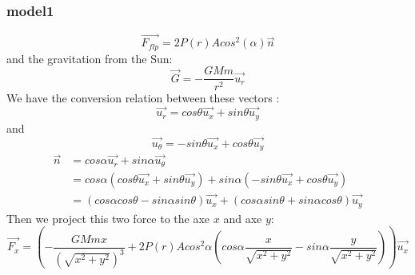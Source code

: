 \documentclass[../Paper.tex]{subfiles}
\begin{document}
\subsubsection{model1}

\begin{equation}
\vec{F_{flp}} = 2P(r)Acos^2(\alpha)\vec{n}
\end{equation}
and the gravitation from the Sun:
\begin{equation}
\vec{G}=-\frac{GMm}{r^2}\vec{u_r}
\end{equation}
We have the conversion relation between these vectors :
\begin{equation}
\vec{u_r}=cos\theta \vec{u_x} + sin\theta \vec{u_y}
\end{equation}
and
\begin{equation} 
\vec{u_\theta}=-sin\theta \vec{u_x} + cos\theta \vec{u_y}
\end{equation}
\begin{align*}
\vec{n} &= cos\alpha \vec{u_r} + sin\alpha \vec{u_\theta}\\
	    &= cos\alpha (cos\theta \vec{u_x} + sin\theta \vec{u_y}) + sin\alpha (-sin\theta \vec{u_x} + cos\theta \vec{u_y}) \\
	    &=(cos\alpha cos\theta - sin\alpha sin\theta )\vec{u_x} + (cos\alpha sin\theta + sin\alpha cos\theta)\vec{u_y}
\end{align*} 
Then we project this two force to the axe $x$ and axe $y$:
\begin{equation}
\vec{F_x} = (-\frac{GMmx}{(\sqrt{x^2+y^2})^3} + 2P(r)Acos^2\alpha(cos\alpha\frac{x}{\sqrt{x^2+y^2}} - sin\alpha\frac{y}{\sqrt{x^2+y^2}}))\vec{u_x}
\end{equation}
\end{document}
